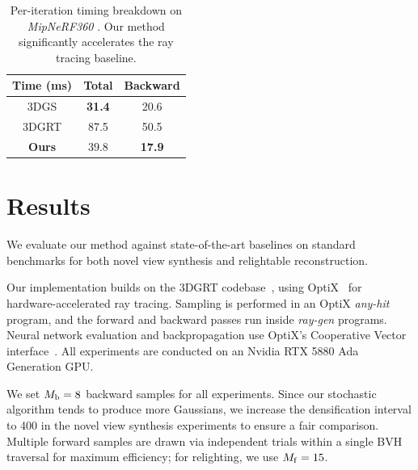 \begin{table}[t]
	\caption{\label{tab:timings}
		Per-iteration timing breakdown on \textsl{MipNeRF360} \cite{barron2022mip}.
		Our method significantly accelerates the ray tracing baseline.
	}
	\centering
	\small
	\begin{tabular}{c|c c}
		\toprule
		\textbf{Time} (ms) & \textbf{Total} & \textbf{Backward} \\
		\midrule
		3DGS               & \textbf{31.4}  & 20.6              \\
		3DGRT              & 87.5           & 50.5              \\
		\textbf{Ours}      & 39.8           & \textbf{17.9}     \\
		\bottomrule
	\end{tabular}
\end{table}


\section{Results}
\label{sec:results}
%
We evaluate our method against state-of-the-art baselines on standard benchmarks for both novel view synthesis and relightable reconstruction.

Our implementation builds on the 3DGRT codebase~\cite{loccoz20243dgrt}, using OptiX~\cite{optix} for hardware-accelerated ray tracing.
Sampling is performed in an OptiX \emph{any-hit} program, and the forward and backward passes run inside \emph{ray-gen} programs. Neural network evaluation and backpropagation use OptiX's Cooperative Vector interface~\cite{optix_coopvec}. All experiments are conducted on an Nvidia RTX 5880 Ada Generation GPU.

We set $M_\mathrm{b}=8$ backward samples for all experiments.
Since our stochastic algorithm tends to produce more Gaussians, we increase the densification interval to 400 in the novel view synthesis experiments to ensure a fair comparison.
Multiple forward samples are drawn via independent trials within a single BVH traversal for maximum efficiency; for relighting, we use $M_\mathrm{f}=15$.

